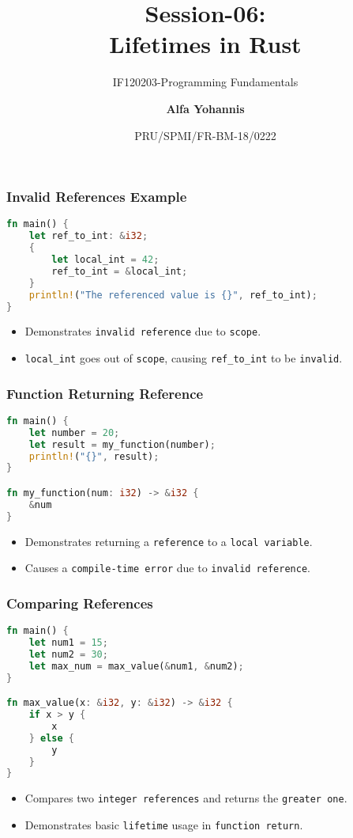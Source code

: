 \documentclass[aspectratio=169, table]{beamer}
\subtitle{IF120203-Programming Fundamentals}
\title{Session-06:\\\LARGE{Lifetimes in Rust}\\ \vspace{10pt}}
\date[Serial]{\scriptsize {PRU/SPMI/FR-BM-18/0222}}
\author[Pradita]{\small{\textbf{Alfa Yohannis}}}
\begin{document}
\frame{\titlepage}

\begin{frame}[fragile]
\frametitle{Invalid References Example}
\begin{lstlisting}[language=Rust]
fn main() {
	let ref_to_int: &i32;
	{
		let local_int = 42;
		ref_to_int = &local_int;
	}
	println!("The referenced value is {}", ref_to_int);
}
\end{lstlisting}
\begin{itemize}
\item Demonstrates \texttt{invalid reference} due to \texttt{scope}.
\item \texttt{local\_int} goes out of \texttt{scope}, causing \texttt{ref\_to\_int} to be \texttt{invalid}.
\end{itemize}
\end{frame}

\begin{frame}[fragile]
\frametitle{Function Returning Reference}
\begin{lstlisting}[language=Rust]
fn main() {
	let number = 20;
	let result = my_function(number);
	println!("{}", result);
}

fn my_function(num: i32) -> &i32 {
	&num
}
\end{lstlisting}
\begin{itemize}
\item Demonstrates returning a \texttt{reference} to a \texttt{local variable}.
\item Causes a \texttt{compile-time error} due to \texttt{invalid reference}.
\end{itemize}
\end{frame}

\begin{frame}[fragile]
\frametitle{Comparing References}
\begin{lstlisting}[language=Rust]
fn main() {
	let num1 = 15;
	let num2 = 30;
	let max_num = max_value(&num1, &num2);
}

fn max_value(x: &i32, y: &i32) -> &i32 {
	if x > y {
		x
	} else {
		y
	}
}
\end{lstlisting}
\begin{itemize}
\item Compares two \texttt{integer references} and returns the \texttt{greater one}.
\item Demonstrates basic \texttt{lifetime} usage in \texttt{function return}.
\end{itemize}
\end{frame}
\end{document}
